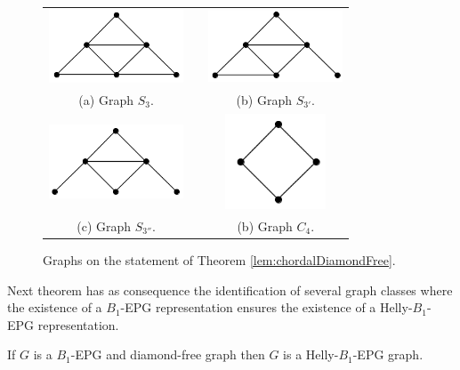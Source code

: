 \documentclass{dmgt}
\begin{document}
%
\begin{figure}[htb]
  \centering
  \begin{tabular}{  c p{0.7cm} c }
    \centering
    \includegraphics[width=4cm]{s3.png} & &
    \includegraphics[width=4cm]{s3-1.png}
    \\
    \footnotesize \centering 
    (a)  \footnotesize Graph $S_3$. &&  \footnotesize (b) Graph $S_{3'}$. \\
    
      \centering 
      \includegraphics[width=4cm]{s3-2.png} & &
    \includegraphics[width=3cm]{c4.png}
    \\
    \footnotesize \centering 
    (c)  \footnotesize Graph $S_{3''}$. && \footnotesize (b) Graph $C_{4}$.\\
  \end{tabular}

 \caption{Graphs on the statement of Theorem \ref{lem:chordalDiamondFree}.}
 \label{fig:proibidos}
\end{figure} 



Next theorem has as consequence the identification of several graph classes where the existence of a $B_1$-EPG representation ensures the existence of a Helly-$B_1$-EPG representation.


\begin{theorem} \label{lem:b1DiamondFree}
 If $G$ is a $B_1$-EPG and diamond-free graph then $G$ is a Helly-$B_1$-EPG graph.
 \end{theorem}
\end{document}
